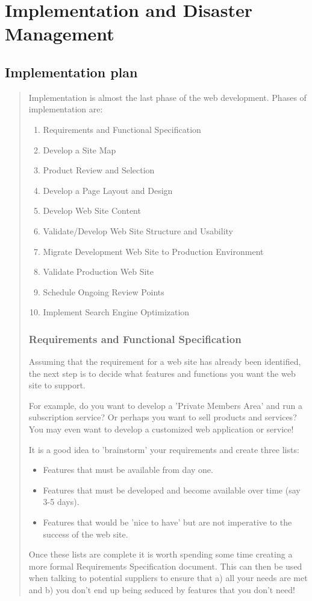 \documentclass[35pt]{report}
\begin{document}
\clearpage

\normalsize

\chapter{Implementation and Disaster Management}

		\section{Implementation plan}
		\begin{quote}
		Implementation is almost the last phase of the web development. Phases of implementation are:
		\begin{enumerate}
			\item Requirements and Functional Specification
			\item Develop a Site Map
			\item Product Review and Selection
			\item Develop a Page Layout and Design
			\item Develop Web Site Content
			\item Validate/Develop Web Site Structure and Usability
			\item Migrate Development Web Site to Production Environment
	 		\item Validate Production Web Site
			\item Schedule Ongoing Review Points
			\item Implement Search Engine Optimization
		\end{enumerate}

			\subsection{Requirements and Functional Specification}
			Assuming that the requirement for a web site has already been identified, the next step is to decide what features and functions you want the web site to support.

			For example, do you want to develop a 'Private Members Area' and run a subscription service? Or perhaps you want to sell products and services? You may even want to develop a customized web application or service!

			It is a good idea to 'brainstorm' your requirements and create three lists:
		\begin{itemize}
			\item Features that must be available from day one.
			\item Features that must be developed and become available over time (say 3-5 days).
			\item Features that would be 'nice to have' but are not imperative to the success of the web site.
		\end{itemize}
		Once these lists are complete it is worth spending some time creating a more formal Requirements Specification document. This can then be used when talking to potential suppliers to ensure that a) all your needs are met and b) you don't end up being seduced by features that you don't need!


\end{quote}
\end{document}
